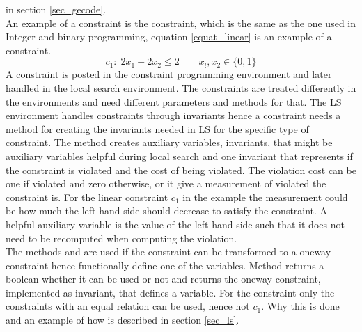 in section \ref{sec_gecode}.   \\ 
An example of a constraint is the  constraint, which is the same as the one used in Integer and binary 
programming, equation \ref{equat_linear} is an example of a  constraint. 
\begin{equation}
 c_1: \; 2x_1 + 2x_2 \leq 2  \qquad x_!,x_2 \in \{0,1\}
\end{equation} \label{equat_linear}
A constraint is posted in the constraint programming environment and later handled in the local search environment. The 
constraints are treated differently in the environments and need different parameters and methods for that. The LS 
environment handles constraints through invariants hence a constraint needs a method for creating the invariants 
needed in LS for the specific type of constraint. The method  creates auxiliary 
variables, invariants, that might be auxiliary variables helpful during local search and one invariant that represents 
if the constraint is violated and the cost of being violated. The violation cost can be one if violated and zero 
otherwise, or it give a measurement of violated the constraint is. For the linear constraint $c_1$ in the example the 
measurement could be how much the left hand side should decrease to satisfy the constraint. A helpful auxiliary 
variable is the value of the left hand side such that it does not need to be recomputed when computing the violation. \\
The methods  and  are used if the constraint can be transformed 
to a oneway constraint hence functionally define one of the variables. Method  returns a 
boolean whether it can be used or not and  returns the oneway constraint, implemented as invariant, 
that defines a variable. For the  constraint only the constraints with an equal relation can be used, 
hence not $c_1$. Why this is done and an example of how is described in section \ref{sec_ls}.